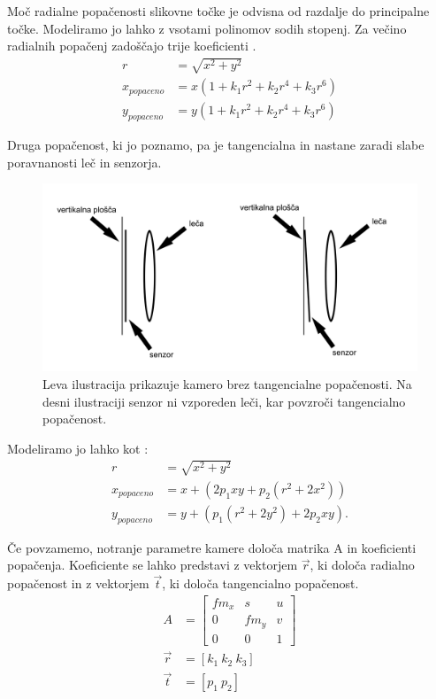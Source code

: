 \documentclass[a4paper, 12pt]{book}
\begin{document}
Moč radialne popačenosti slikovne točke je odvisna od razdalje do principalne točke. Modeliramo jo lahko z vsotami polinomov sodih stopenj. Za večino radialnih popačenj zadoščajo trije koeficienti \cite{ Hartley2004, zhang2000flexible, brown1966decentering}. 
\begin{align}
r &= \sqrt{x^2 + y^2} \\ 
x_{popaceno} &= x(1 + k_1r^2 + k_2r^4 + k_3r^6) \\
y_{popaceno} &= y(1 + k_1r^2 + k_2r^4 + k_3r^6) \label{radialdisteq}
\end{align}

Druga popačenost, ki jo poznamo, pa je tangencialna in nastane zaradi slabe poravnanosti leč in senzorja.

\begin{figure}[H]
\centering
\includegraphics[width=\textwidth,height=\textheight,keepaspectratio]{tangential.png}
\caption{Leva ilustracija prikazuje kamero brez tangencialne popačenosti. Na desni ilustraciji senzor ni vzporeden leči, kar povzroči tangencialno popačenost.}
\end{figure}

Modeliramo jo lahko kot \cite{brown1966decentering}:
\begin{align}
r &= \sqrt{x^2 + y^2} \\ 
x_{popaceno} &= x + (2p_1xy + p_2(r^2 + 2x^2)) \\
y_{popaceno} &= y + (p_1(r^2 + 2y^2) + 2p_2xy). \label{tangentialdisteq}
\end{align}

Če povzamemo, notranje parametre kamere določa matrika A in koeficienti popačenja. Koeficiente se lahko predstavi z vektorjem $\vec{r}$, ki določa radialno popačenost in z vektorjem $\vec{t}$, ki določa tangencialno popačenost.
\begin{align*}
A &= 
\begin{bmatrix}
fm_x & s & u \\
0 & fm_y & v \\
0 & 0 & 1
\end{bmatrix} \\
\vec{r} &= [k_1 \ k_2 \ k_3] \\
\vec{t} &= [p_1 \ p_2]
\end{align*}
\end{document}
